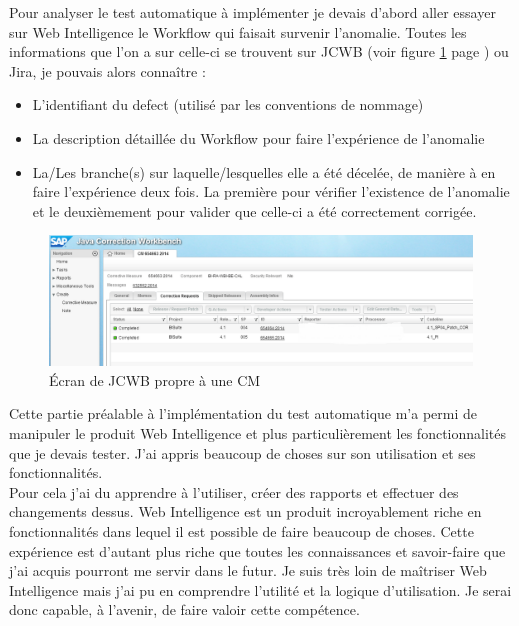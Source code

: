 Pour analyser le test automatique \`{a} impl\'{e}menter je devais d'abord aller essayer sur Web Intelligence le \gls{Workflow} qui faisait survenir l'anomalie. Toutes les informations que l'on a sur celle-ci se trouvent sur JCWB (voir figure \ref{figure:JCWB-CRs} page \pageref{figure:JCWB-CRs}) ou Jira, je pouvais alors conna\^{i}tre :
\begin{itemize}
	\item L'identifiant du defect (utilis\'{e} par les conventions de nommage)
	\item La description d\'{e}taill\'{e}e du \gls{Workflow} pour faire l'exp\'{e}rience de l'anomalie
	\item La/Les branche(s) sur laquelle/lesquelles elle a \'{e}t\'{e} d\'{e}cel\'{e}e, de mani\`{e}re \`{a} en faire l'exp\'{e}rience deux fois. La premi\`{e}re pour v\'{e}rifier l'existence de l'anomalie et le deuxi\`{e}mement pour valider que celle-ci a \'{e}t\'{e} correctement corrig\'{e}e.
\end{itemize}
\begin{figure}[!ht]
  \centering
      \includegraphics[width=\textwidth]{images/JCWB-CRs.png}
  \caption{\'{E}cran de JCWB propre \`{a} une CM}
	\label{figure:JCWB-CRs}
\end{figure}

Cette partie pr\'{e}alable \`{a} l'impl\'{e}mentation du test automatique m'a permi de manipuler le produit Web Intelligence et plus particuli\`{e}rement les fonctionnalit\'{e}s que je devais tester. J'ai appris beaucoup de choses sur son utilisation et ses fonctionnalit\'{e}s. \\
Pour cela j'ai du apprendre \`{a} l'utiliser, cr\'{e}er des rapports et effectuer des changements dessus. Web Intelligence est un produit incroyablement riche en fonctionnalit\'{e}s dans lequel il est possible de faire beaucoup de choses. Cette exp\'{e}rience est d'autant plus riche que toutes les connaissances et savoir-faire que j'ai acquis pourront me servir dans le futur. Je suis tr\`{e}s loin de ma\^{i}triser Web Intelligence mais j'ai pu en comprendre l'utilit\'{e} et la logique d'utilisation. Je serai donc capable, \`{a} l'avenir, de faire valoir cette comp\'{e}tence.\\

